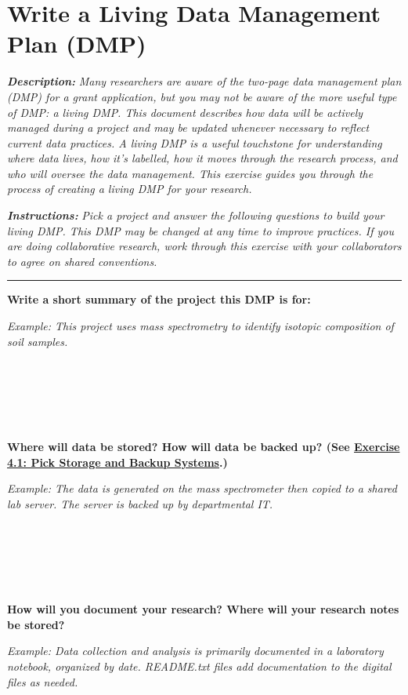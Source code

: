 \documentclass[
]{book}
\begin{document}
\hypertarget{living-dmp}{%
\section{Write a Living Data Management Plan (DMP)}\label{living-dmp}}

\textbf{\emph{Description:}} \emph{Many researchers are aware of the two-page data management plan (DMP) for a grant application, but you may not be aware of the more useful type of DMP: a living DMP. This document describes how data will be actively managed during a project and may be updated whenever necessary to reflect current data practices. A living DMP is a useful touchstone for understanding where data lives, how it's labelled, how it moves through the research process, and who will oversee the data management. This exercise guides you through the process of creating a living DMP for your research.}

\textbf{\emph{Instructions:}} \emph{Pick a project and answer the following questions to build your living DMP. This DMP may be changed at any time to improve practices. If you are doing collaborative research, work through this exercise with your collaborators to agree on shared conventions.}

\begin{center}\rule{0.5\linewidth}{0.5pt}\end{center}

\textbf{Write a short summary of the project this DMP is for:}

\emph{Example: This project uses mass spectrometry to identify isotopic composition of soil samples.}

~

~

~

\textbf{Where will data be stored? How will data be backed up? (See \protect\hyperlink{storage}{Exercise 4.1: Pick Storage and Backup Systems}.)}

\emph{Example: The data is generated on the mass spectrometer then copied to a shared lab server. The server is backed up by departmental IT.}

~

~

~

\textbf{How will you document your research? Where will your research notes be stored?}

\emph{Example: Data collection and analysis is primarily documented in a laboratory notebook, organized by date. README.txt files add documentation to the digital files as needed.}
\end{document}
